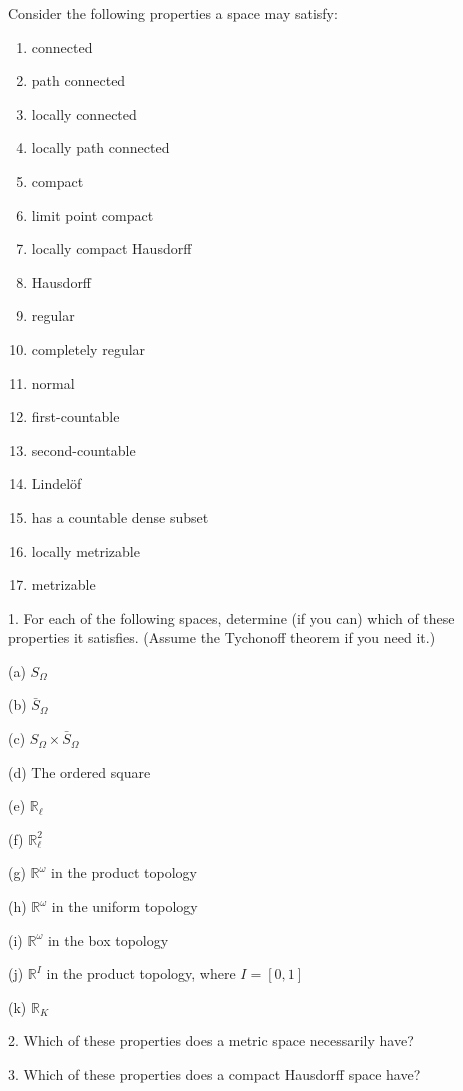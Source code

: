 Consider the following properties a space may satisfy:

\begin{enumerate}[itemsep=0.2em, parsep=0pt, topsep=0pt, partopsep=0pt, leftmargin=*, label=(\arabic*), align=left]
\item connected
\item path connected
\item locally connected
\item locally path connected
\item compact
\item limit point compact
\item locally compact Hausdorff
\item Hausdorff
\item regular
\item completely regular
\item normal
\item first-countable
\item second-countable
\item Lindelöf
\item has a countable dense subset
\item locally metrizable
\item metrizable
\end{enumerate}

1. For each of the following spaces, determine (if you can) which of these properties it satisfies. (Assume the Tychonoff theorem if you need it.)

(a) \(S_{\Omega }\)

(b) \(\bar{S}_{\Omega }\)

(c) \(S_{\Omega } \times {\bar{S}}_{\Omega }\)

(d) The ordered square

(e) \(\mathbb{R}_{\ell }\)

(f) \(\mathbb{R}_{\ell }^{2}\)

(g) \(\mathbb{R}^{\omega }\) in the product topology

(h) \(\mathbb{R}^{\omega }\) in the uniform topology

(i) \(\mathbb{R}^{\omega }\) in the box topology

(j) \(\mathbb{R}^{I}\) in the product topology, where \(I = [ {0,1}]\)

(k) \(\mathbb{R}_{K}\)

2. Which of these properties does a metric space necessarily have?

3. Which of these properties does a compact Hausdorff space have?

